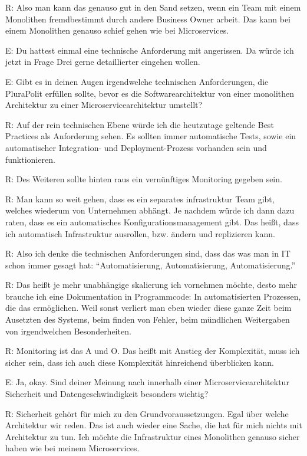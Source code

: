\label{appendix:r-25}
R: Also man kann das genauso gut in den Sand setzen, wenn ein Team mit einem Monolithen  fremdbestimmt durch andere Business Owner arbeit. Das kann bei einem Monolithen genauso schief gehen wie bei Microservices.

E: Du hattest einmal eine technische Anforderung mit angerissen. Da würde ich jetzt in Frage Drei gerne detaillierter eingehen wollen. 

E: Gibt es in deinen Augen irgendwelche technischen Anforderungen, die PluraPolit erfüllen sollte, bevor es die Softwarearchitektur von einer monolithen Architektur zu einer Microservicearchitektur umstellt? 

\label{appendix:r-26} \label{appendix:r-27}
R: Auf der rein technischen Ebene würde ich die heutzutage geltende Best Practices als Anforderung sehen. Es sollten immer automatische Tests, sowie ein automatischer Integration- und Deployment-Prozess vorhanden sein und funktionieren.

\label{appendix:r-28}
R: Des Weiteren sollte hinten raus ein vernünftiges Monitoring gegeben sein.

R: Man kann so weit gehen, dass es ein separates infrastruktur Team gibt, welches wiederum von Unternehmen abhängt. Je nachdem würde ich dann dazu raten, dass es ein automatisches Konfigurationsmanagement gibt. Das heißt, dass ich automatisch Infrastruktur ausrollen, bzw. ändern und replizieren kann.

\label{appendix:r-29}
R: Also ich denke die technischen Anforderungen sind, dass das was man in IT schon immer gesagt hat:  “Automatisierung, Automatisierung, Automatisierung.”

\label{appendix:r-30}
R: Das heißt je mehr unabhängige skalierung ich vornehmen möchte, desto mehr brauche ich eine Dokumentation in Programmcode: In automatisierten Prozessen, die das ermöglichen.
Weil sonst verliert man eben wieder diese ganze Zeit beim Ausetzten des Systems, beim finden von Fehler, beim mündlichen Weitergaben von irgendwelchen Besonderheiten. 

\label{appendix:r-31}
R: Monitoring ist das A und O. Das heißt mit Anstieg der Komplexität, muss ich sicher sein, dass ich auch diese Komplexität hinreichend überblicken kann.

E: Ja, okay. Sind deiner Meinung nach innerhalb einer Microservicearchitektur Sicherheit und Datengeschwindigkeit besonders wichtig?

\label{appendix:r-32}
R: Sicherheit gehört für mich zu den Grundvoraussetzungen. Egal über welche Architektur wir reden. Das ist auch wieder eine Sache, die hat für mich nichts mit Architektur zu tun. Ich möchte  die Infrastruktur eines Monolithen genauso sicher haben wie bei meinem Microservices. 


